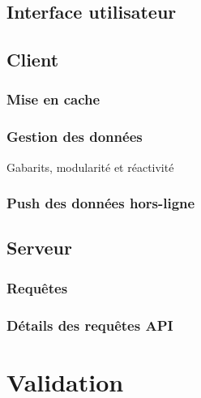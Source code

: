 \documentclass{EPL-master-thesis-covers-FR}
\begin{document}
			

		\section{Interface utilisateur}

		\section{Client}


			\subsection*{Mise en cache}
				\label{sec:cache_client}

			
			\subsection*{Gestion des données}
				Gabarits, modularité et réactivité

			\subsection*{Push des données hors-ligne}
				\label{sec:service_worker}
				
				

			

		\section{Serveur}
			\label{sec:serveur}

		

			\subsection*{Requêtes}

			

			\subsection*{Détails des requêtes API}
				\label{sec:api}

			

	\chapter{Validation}
\end{document}

